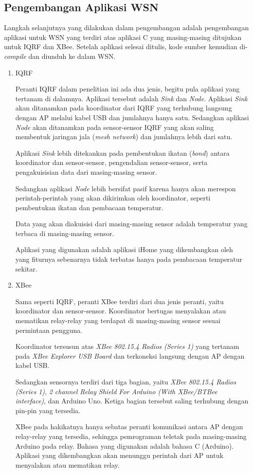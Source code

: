 		\subsection{Pengembangan Aplikasi WSN}
			Langkah selanjutnya yang dilakukan dalam pengembangan adalah pengembangan aplikasi untuk WSN yang terdiri atas aplikasi C yang masing-masing ditujukan untuk IQRF dan XBee. Setelah aplikasi selesai ditulis, kode sumber kemudian di-\emph{compile} dan diunduh ke dalam WSN.

			\begin{enumerate}
				\item IQRF

					Peranti IQRF dalam penelitian ini ada dua jenis, begitu pula aplikasi yang tertanam di dalamnya. Aplikasi tersebut adalah \emph{Sink} dan \emph{Node}. Aplikasi \emph{Sink} akan ditanamkan pada koordinator dari IQRF yang terhubung langsung dengan AP melalui kabel USB dan jumlahnya hanya satu. Sedangkan aplikasi \emph{Node} akan ditanamkan pada sensor-sensor IQRF yang akan saling membentuk jaringan jala (\emph{mesh network}) dan jumlahnya lebih dari satu.

					Aplikasi \emph{Sink} lebih ditekankan pada pembentukan ikatan (\emph{bond}) antara koordinator dan sensor-sensor, pengendalian sensor-sensor, serta pengakuisisian data dari masing-masing sensor.

					Sedangkan aplikasi \emph{Node} lebih bersifat pasif karena hanya akan merespon perintah-perintah yang akan dikirimkan oleh koordinator, seperti pembentukan ikatan dan pembacaan temperatur.

					Data yang akan diakuisisi dari masing-masing sensor adalah temperatur yang terbaca di masing-masing sensor.

					Aplikasi yang digunakan adalah aplikasi iHome yang dikembangkan oleh \cite{widyawan2012ihome} yang fiturnya sebenarnya tidak terbatas hanya pada pembacaan temperatur sekitar.

				\item XBee

					Sama seperti IQRF, peranti XBee terdiri dari dua jenis peranti, yaitu koordinator dan sensor-sensor. Koordinator bertugas menyalakan atau mematikan relay-relay yang terdapat di masing-masing sensor sesuai permintaan pengguna.

					Koordinator tersusun atas \emph{XBee 802.15.4 Radios (Series 1)} yang tertanam pada \emph{XBee Explorer USB Board} dan terkoneksi langsung dengan AP dengan kabel USB.

					Sedangkan sensornya terdiri dari tiga bagian, yaitu \emph{XBee 802.15.4 Radios (Series 1)}, \emph{2 channel Relay Shield For Arduino (With XBee/BTBee interface)}, dan Arduino Uno. Ketiga bagian tersebut saling terhubung dengan pin-pin yang tersedia.

					XBee pada hakikatnya hanya sebatas peranti komunikasi antara AP dengan relay-relay yang tersedia, sehingga pemrograman teletak pada masing-masing Arduino pada relay. Bahasa yang digunakan adalah bahasa C (Arduino). Aplikasi yang dikembangkan akan menunggu perintah dari AP untuk menyalakan atau mematikan relay.

			\end{enumerate}


